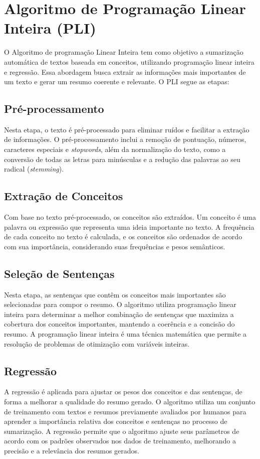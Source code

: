 \section{Algoritmo de Programação Linear Inteira (PLI)}
\label{sec:algoritmo-oliveira}

O Algoritmo de programação Linear Inteira tem como objetivo a sumarização automática de textos baseada em conceitos, utilizando programação linear inteira e regressão. Essa abordagem busca extrair as informações mais importantes de um texto e gerar um resumo coerente e relevante. O PLI segue as etapas:

\subsection{Pré-processamento}
Nesta etapa, o texto é pré-processado para eliminar ruídos e facilitar a extração de informações. O pré-processamento inclui a remoção de pontuação, números, caracteres especiais e \textit{stopwords}, além da normalização do texto, como a conversão de todas as letras para minúsculas e a redução das palavras ao seu radical (\textit{stemming}).

\subsection{Extração de Conceitos}
Com base no texto pré-processado, os conceitos são extraídos. Um conceito é uma palavra ou expressão que representa uma ideia importante no texto. A frequência de cada conceito no texto é calculada, e os conceitos são ordenados de acordo com sua importância, considerando suas frequências e pesos semânticos.

\subsection{Seleção de Sentenças}
Nesta etapa, as sentenças que contêm os conceitos mais importantes são selecionadas para compor o resumo. O algoritmo utiliza programação linear inteira para determinar a melhor combinação de sentenças que maximiza a cobertura dos conceitos importantes, mantendo a coerência e a concisão do resumo. A programação linear inteira é uma técnica matemática que permite a resolução de problemas de otimização com variáveis inteiras.

\subsection{Regressão}
A regressão é aplicada para ajustar os pesos dos conceitos e das sentenças, de forma a melhorar a qualidade do resumo gerado. O algoritmo utiliza um conjunto de treinamento com textos e resumos previamente avaliados por humanos para aprender a importância relativa dos conceitos e sentenças no processo de sumarização. A regressão permite que o algoritmo ajuste seus parâmetros de acordo com os padrões observados nos dados de treinamento, melhorando a precisão e a relevância dos resumos gerados.


